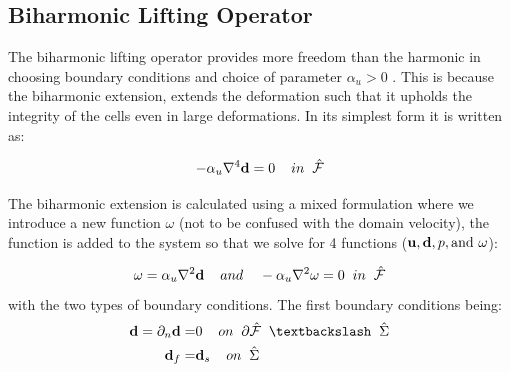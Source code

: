 \subsection{Biharmonic Lifting Operator} 
The biharmonic lifting operator provides more freedom than the harmonic in choosing boundary conditions and choice of parameter $\alpha_u > 0$ \cite{MM2016,Wick2011a}. This is because the biharmonic extension, extends the deformation such that it upholds the integrity of the cells even in large deformations. In its simplest form it is written as:

\begin{equation}
- \alpha_u \nabla^4 \bold{d} = 0 \hspace{4mm}  in \hspace{2mm} \hat{\mathcal{F}}\\
\end{equation}

The biharmonic extension is calculated using a mixed formulation where we introduce a new function $\omega$ (not to be confused with the domain velocity), the function is added to the system so that we solve for 4 functions ($\bold{u}, \bold{d}, p, \text{and } \omega$):
 
\begin{equation}
\omega = \alpha_u \nabla^2 \bold{d} \hspace{4mm} and \hspace{4mm} - \alpha_u \nabla^2 \omega = 0 \hspace{2mm}   in \hspace{2mm} \hat{\mathcal{F}}
\end{equation}
with the two types of boundary conditions. The first boundary conditions being:
\begin{align}
\bold{d} = \partial_n \bold{d} =& 0 \hspace{4mm} on \hspace{2mm} \partial \hat{\mathcal{F}} \hspace{2mm} \textbackslash \hspace{2mm} \hat{\Sigma}\\
\bold{d}_f =& \bold{d}_s \hspace{4mm } on \hspace{2mm } \hat{\Sigma} 
\end{align}

